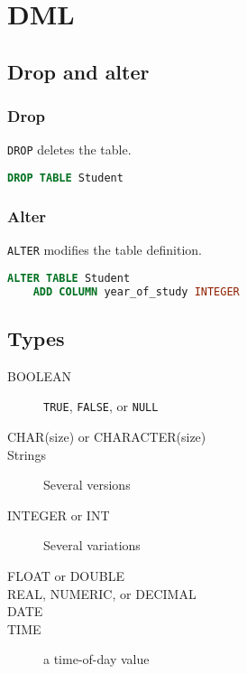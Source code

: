 \chapter{DML}
\section{Drop and alter}
\subsection{Drop}
\verb|DROP| deletes the table.

\begin{lstlisting}[tabsize=3, language=sql]
DROP TABLE Student
\end{lstlisting}

\subsection{Alter}
\verb|ALTER| modifies the table definition.

\begin{lstlisting}[tabsize=3, language=sql]
ALTER TABLE Student
	ADD COLUMN year_of_study INTEGER
\end{lstlisting}

\section{Types}
\begin{description}
	\item[BOOLEAN] \verb|TRUE|, \verb|FALSE|, or \verb|NULL|
	\item[CHAR(size) or CHARACTER(size)]
	\item[Strings] Several versions
	\item[INTEGER or INT] Several variations
	\item[FLOAT or DOUBLE]
	\item[REAL, NUMERIC, or DECIMAL]
	\item[DATE]
	\item[TIME] a time-of-day value
\end{description}